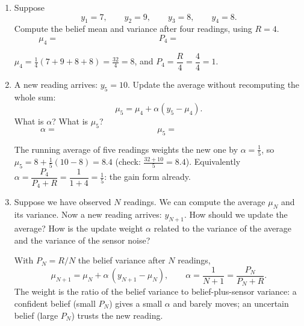 \documentclass[11pt]{article}
\begin{document}
\begin{enumerate}
  \item Suppose
  \[
  y_1=7,\qquad y_2=9,\qquad y_3=8,\qquad y_4=8.
  \]
  Compute the belief mean and variance after four readings, using $R=4$.
  \[
  \mu_4 =
  \hspace{5cm}
  P_4 =
  \hspace{5cm}
  \]

  \vspace{1.4em}

  \begin{solution}
  $\mu_4=\tfrac{1}{4}(7+9+8+8)=\tfrac{32}{4}=8$, and
  $P_4=\dfrac{R}{4}=\dfrac{4}{4}=1$.
  \end{solution}

  \item A new reading arrives: $y_5=10$. Update the average without recomputing
  the whole sum:
  \[
  \mu_5
  =
  \mu_4+\alpha(y_5-\mu_4).
  \]
  What is $\alpha$? What is $\mu_5$?
  \[
  \alpha =
  \hspace{5cm}
  \mu_5 =
  \hspace{5cm}
  \]

  \vspace{1.4em}

  \begin{solution}
  The running average of five readings weights the new one by
  $\alpha=\tfrac{1}{5}$, so
  $\mu_5=8+\tfrac{1}{5}(10-8)=8.4$ (check: $\tfrac{32+10}{5}=8.4$). Equivalently
  $\alpha=\dfrac{P_4}{P_4+R}=\dfrac{1}{1+4}=\tfrac{1}{5}$: the gain form already.
  \end{solution}

  \item Suppose we have observed $N$ readings. We can compute the average
  $\mu_N$ and its variance. Now a new reading arrives: $y_{N+1}$. How should we
  update the average? How is the update weight $\alpha$ related to the variance
  of the average and the variance of the sensor noise?

  \vspace{3em}

  \begin{solution}
  With $P_N=R/N$ the belief variance after $N$ readings,
  \[
  \mu_{N+1}=\mu_N+\alpha\,(y_{N+1}-\mu_N),
  \qquad
  \alpha=\frac{1}{N+1}=\frac{P_N}{P_N+R}.
  \]
  The weight is the ratio of the belief variance to belief-plus-sensor
  variance: a confident belief (small $P_N$) gives a small $\alpha$ and barely
  moves; an uncertain belief (large $P_N$) trusts the new reading.
  \end{solution}
\end{enumerate}
\end{document}
